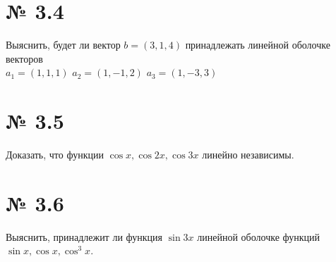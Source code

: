 \documentclass[a4paper,11pt]{report}
\begin{document}
\section{№ 3.4}
Выяснить, будет ли вектор $b = (3, 1, 4)$ принадлежать 
линейной оболочке векторов\\
$a_1 = (1, 1, 1)$
$a_2 = (1, -1, 2)$
$a_3 = (1, -3, 3)$
\section{№ 3.5}
Доказать, что функции $\cos{x}, \cos{2x}, \cos{3x}$ линейно независимы.
\section{№ 3.6}
Выяснить, принадлежит ли функция $\sin{3x}$ линейной оболочке функций $\sin{x}, \cos{x}, \cos^3{x}$.
\end{document}
